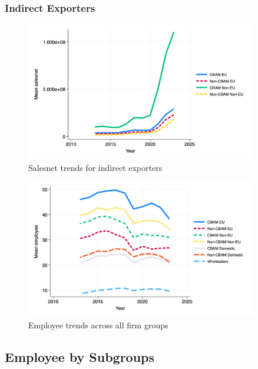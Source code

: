 \documentclass{article}
\begin{document}
\subsubsection{Indirect Exporters}
\begin{figure}[h!]
\centering
\includegraphics[width=0.9\textwidth]{salesnet_indir.png}
\caption{Salesnet trends for indirect exporters}
\label{fig:salesnet_indir}
\end{figure}

\begin{figure}[h!]
\centering
\includegraphics[width=0.9\textwidth]{employee_main_groups.png}
\caption{Employee trends across all firm groups}
\label{fig:employee_main}
\end{figure}

\subsection{Employee by Subgroups}
\end{document}
